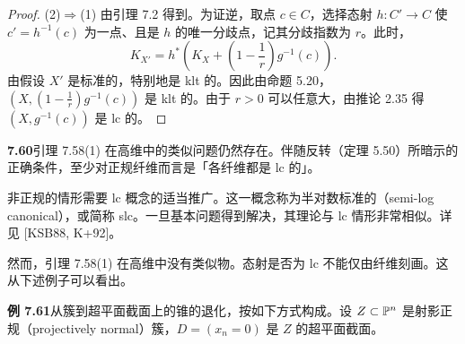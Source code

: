 \begin{proof}
(2)$\Rightarrow$(1) 由引理 7.2 得到。为证逆，取点 $c\in C$，选择态射 $h\colon C'\to C$ 使 $c'=h^{-1}(c)$ 为一点、且是 $h$ 的唯一分歧点，记其分歧指数为 $r$。此时，
\[
K_{X'}=h^*\left(K_X+\left(1-\frac1r\right)g^{-1}(c)\right).
\]
由假设 $X'$ 是标准的，特别地是 klt 的。因此由命题 5.20，$(X,(1-\frac1r)g^{-1}(c))$ 是 klt 的。由于 $r>0$ 可以任意大，由推论 2.35 得 $(X,g^{-1}(c))$ 是 lc 的。
\end{proof}


\par\medskip\noindent\textbf{7.60}\quad 引理 7.58(1) 在高维中的类似问题仍然存在。伴随反转（定理 5.50）所暗示的正确条件，至少对正规纤维而言是「各纤维都是 lc 的」。

非正规的情形需要 lc 概念的适当推广。这一概念称为半对数标准的（semi-log canonical），或简称 slc。一旦基本问题得到解决，其理论与 lc 情形非常相似。详见 [KSB88, K+92]。

然而，引理 7.58(1) 在高维中没有类似物。态射是否为 lc 不能仅由纤维刻画。这从下述例子可以看出。

\par\medskip\noindent\textbf{例 7.61}\quad 从簇到超平面截面上的锥的退化，按如下方式构成。设 $Z\subset\mathbb{P}^n$ 是射影正规（projectively normal）簇，$D=(x_n=0)$ 是 $Z$ 的超平面截面。
